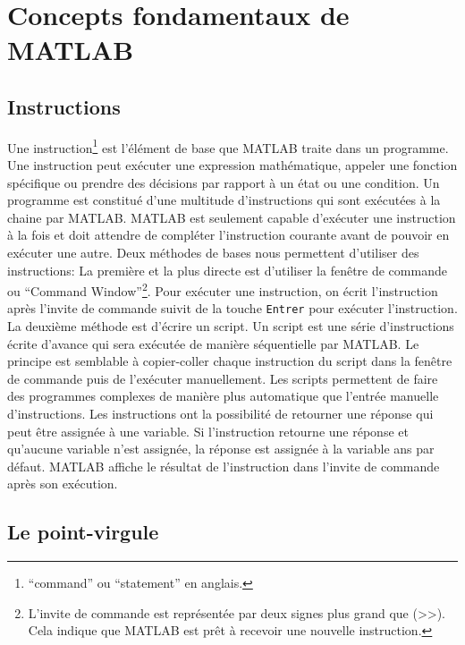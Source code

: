 \documentclass[]{tufte-handout}
\newcommand{\passthrough}[1]{#1}
\begin{document}
\hypertarget{concepts-fondamentaux-de-matlab}{%
\section{Concepts fondamentaux de
MATLAB}\label{concepts-fondamentaux-de-matlab}}

\hypertarget{instructions}{%
\subsection{Instructions}\label{instructions}}

Une instruction\footnote{``command'' ou ``statement'' en anglais.} est
l'élément de base que MATLAB traite dans un programme. Une instruction
peut exécuter une expression mathématique, appeler une fonction
spécifique ou prendre des décisions par rapport à un état ou une
condition. Un programme est constitué d'une multitude d'instructions qui
sont exécutées à la chaine par MATLAB. MATLAB est seulement capable
d'exécuter une instruction à la fois et doit attendre de compléter
l'instruction courante avant de pouvoir en exécuter une autre. Deux
méthodes de bases nous permettent d'utiliser des instructions: La
première et la plus directe est d'utiliser la fenêtre de commande ou
``Command Window''\footnote{L'invite de commande est représentée par
  deux signes plus grand que (\textgreater{}\textgreater{}). Cela
  indique que MATLAB est prêt à recevoir une nouvelle instruction.}.
Pour exécuter une instruction, on écrit l'instruction après l'invite de
commande suivit de la touche \passthrough{\lstinline!Entrer!} pour
exécuter l'instruction. La deuxième méthode est d'écrire un script. Un
script est une série d'instructions écrite d'avance qui sera exécutée de
manière séquentielle par MATLAB. Le principe est semblable à
copier-coller chaque instruction du script dans la fenêtre de commande
puis de l'exécuter manuellement. Les scripts permettent de faire des
programmes complexes de manière plus automatique que l'entrée manuelle
d'instructions. Les instructions ont la possibilité de retourner une
réponse qui peut être assignée à une variable. Si l'instruction retourne
une réponse et qu'aucune variable n'est assignée, la réponse est
assignée à la variable ans par défaut. MATLAB affiche le résultat de
l'instruction dans l'invite de commande après son exécution.

\hypertarget{le-point-virgule}{%
\subsection{Le point-virgule}\label{le-point-virgule}}
\end{document}
